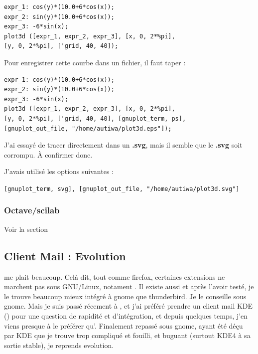 \documentclass[a4paper,twoside]{article}
\begin{document}
\begin{verbatim}
expr_1: cos(y)*(10.0+6*cos(x));
expr_2: sin(y)*(10.0+6*cos(x));
expr_3: -6*sin(x);
plot3d ([expr_1, expr_2, expr_3], [x, 0, 2*%pi],
[y, 0, 2*%pi], ['grid, 40, 40]);
\end{verbatim}

Pour enregistrer cette courbe dans un fichier, il faut taper :

\begin{verbatim}
expr_1: cos(y)*(10.0+6*cos(x));
expr_2: sin(y)*(10.0+6*cos(x));
expr_3: -6*sin(x);
plot3d ([expr_1, expr_2, expr_3], [x, 0, 2*%pi],
[y, 0, 2*%pi], ['grid, 40, 40], [gnuplot_term, ps],
[gnuplot_out_file, "/home/autiwa/plot3d.eps"]);
\end{verbatim}

\begin{remarque}
J'ai essayé de tracer directement dans un \textbf{.svg}, mais il semble que le \textbf{.svg} soit corrompu. À confirmer donc.

J'avais utilisé les options suivantes :

\texttt{[gnuplot\_term, svg], [gnuplot\_out\_file, "/home/autiwa/plot3d.svg"]}
\end{remarque}

\subsubsection{Octave/scilab}
Voir la section 

\subsection{Client Mail : Evolution}
 me plait beaucoup. Celà dit, tout comme firefox, certaines extensions ne marchent pas sous GNU/Linux, notament . Il existe aussi  et après l'avoir testé, je le trouve beaucoup mieux intégré à gnome que thunderbird. Je le conseille sous gnome. Mais je suis passé récement à , et j'ai préféré prendre un client mail KDE () pour une question de rapidité et d'intégration, et depuis quelques temps, j'en viens presque à le préférer qu'. Finalement repassé sous gnome, ayant été déçu par KDE que je trouve trop compliqué et fouilli, et buguant (surtout KDE4 à sa sortie stable), je reprends evolution.
\end{document}
